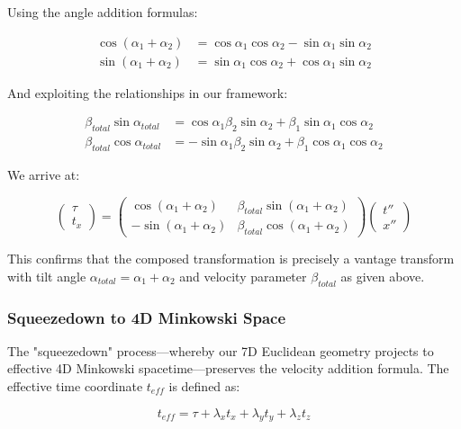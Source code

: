\documentclass{article}
\begin{document}
Using the angle addition formulas:

\begin{align}
\cos(\alpha_1+\alpha_2) &= \cos\alpha_1\cos\alpha_2 - \sin\alpha_1\sin\alpha_2 \\
\sin(\alpha_1+\alpha_2) &= \sin\alpha_1\cos\alpha_2 + \cos\alpha_1\sin\alpha_2
\end{align}

And exploiting the relationships in our framework:

\begin{align}
\beta_{total}\sin\alpha_{total} &= \cos\alpha_1\beta_2\sin\alpha_2 + \beta_1\sin\alpha_1\cos\alpha_2 \\
\beta_{total}\cos\alpha_{total} &= -\sin\alpha_1\beta_2\sin\alpha_2 + \beta_1\cos\alpha_1\cos\alpha_2
\end{align}

We arrive at:

\begin{equation}
\begin{pmatrix} \tau \\ t_x \end{pmatrix} = 
\begin{pmatrix} \cos(\alpha_1+\alpha_2) & \beta_{total}\sin(\alpha_1+\alpha_2) \\ -\sin(\alpha_1+\alpha_2) & \beta_{total}\cos(\alpha_1+\alpha_2) \end{pmatrix}
\begin{pmatrix} t'' \\ x'' \end{pmatrix}
\end{equation}

This confirms that the composed transformation is precisely a vantage transform with tilt angle $\alpha_{total} = \alpha_1 + \alpha_2$ and velocity parameter $\beta_{total}$ as given above.

\subsubsection{Squeezedown to 4D Minkowski Space}

The "squeezedown" process—whereby our 7D Euclidean geometry projects to effective 4D Minkowski spacetime—preserves the velocity addition formula. The effective time coordinate $t_{eff}$ is defined as:

\begin{equation}
t_{eff} = \tau + \lambda_x t_x + \lambda_y t_y + \lambda_z t_z
\end{equation}
\end{document}
